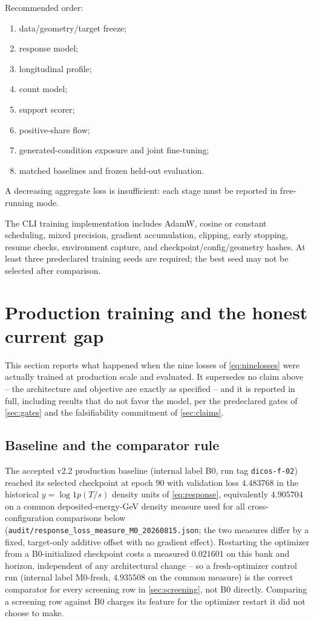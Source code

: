 \documentclass[10pt,a4paper]{article}
\begin{document}
Recommended order:
\begin{enumerate}
\item data/geometry/target freeze;
\item response model;
\item longitudinal profile;
\item count model;
\item support scorer;
\item positive-share flow;
\item generated-condition exposure and joint fine-tuning;
\item matched baselines and frozen held-out evaluation.
\end{enumerate}
A decreasing aggregate loss is insufficient: each stage must be reported in free-running mode.

The CLI training implementation includes AdamW, cosine or constant scheduling, mixed precision, gradient accumulation, clipping, early stopping, resume checks, environment capture, and checkpoint/config/geometry hashes. At least three predeclared training seeds are required; the best seed may not be selected after comparison.

\section{Production training and the honest current gap}
\label{sec:production_results}

This section reports what happened when the nine losses of \cref{eq:ninelosses} were actually trained at production scale and evaluated. It supersedes no claim above -- the architecture and objective are exactly as specified -- and it is reported in full, including results that do not favor the model, per the predeclared gates of \cref{sec:gates} and the falsifiability commitment of \cref{sec:claims}.

\subsection{Baseline and the comparator rule}
The accepted v2.2 production baseline (internal label B0, run tag \texttt{dicos-f-02}) reached its selected checkpoint at epoch 90 with validation loss $4.483768$ in the historical $y=\log1p(T/s)$ density units of \cref{eq:response}, equivalently $4.905704$ on a common deposited-energy-GeV density measure used for all cross-configuration comparisons below (\texttt{audit/response\_loss\_measure\_M0\_20260815.json}; the two measures differ by a fixed, target-only additive offset with no gradient effect). Restarting the optimizer from a B0-initialized checkpoint costs a measured $0.021601$ on this bank and horizon, independent of any architectural change -- so a fresh-optimizer control run (internal label M0-fresh, $4.935508$ on the common measure) is the correct comparator for every screening row in \cref{sec:screening}, not B0 directly. Comparing a screening row against B0 charges its feature for the optimizer restart it did not choose to make.
\end{document}
